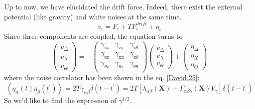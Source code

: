 \documentclass[books,12pt]{elegantpaper}
\newcommand{\beq}{\begin{equation}}
\newcommand{\eeq}{\end{equation}}
\newcommand{\llang}{\left\langle}
\newcommand{\rrang}{\right\rangle}
\begin{document}
Up to now, we have elucidated the drift force. Indeed, there exist the external potential (like gravity) and white noises at the same time.
\beq \dot{v}_i = F_i + TF^{drift}_i + \eta_i \eeq
Since three components are coupled, the equation turns to
\beq \left(\begin{array}{c}\dot{v}_\Delta \\\dot{v}_X \\\dot{v}_\Theta\end{array}\right) = - \left(
\begin{array}{ccc}
 \gamma _{\text{zz}} & \gamma _{\text{zx}} & \gamma _{\text{z$\theta $}} \\
 \gamma _{\text{xz}} & \gamma _{\text{xx}} & \gamma _{\text{x$\theta $}} \\
 \gamma _{\text{$\theta $z}} & \gamma _{\text{$\theta $x}} & \gamma _{\theta \theta } \\
\end{array}
\right)\left(\begin{array}{c}v_\Delta \\v_X \\v_\Theta\end{array}\right) + \left(\begin{array}{c}\eta_\Delta \\\eta_X \\\eta_\Theta\end{array}\right) \eeq
where the noise correlator has been shown in the eq. \ref{David.25}: 
$$\llang \eta_\alpha (t) \eta_\beta(t^\prime) \rrang = 2T \gamma_{\alpha \beta} \delta(t-t^\prime) = 2T \left[ \lambda_{\alpha\beta}(\mathbf{X}) + \Gamma_{\alpha\beta\gamma}(\mathbf{X}) V_\gamma \right] \delta(t-t^\prime)$$
So we'd like to find the expression of $\gamma^{1/2}$.
\end{document}
